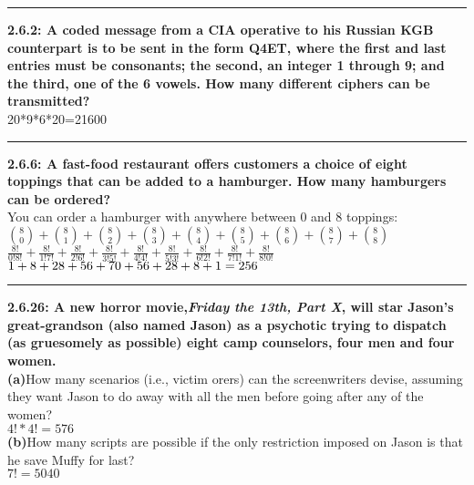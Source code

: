 \documentclass[11pt]{article}
\newcommand\question[2]{\vspace{.25in}\hrule\textbf{#1: #2}}
\renewcommand\part[1]{\vspace{.10in}\textbf{(#1)}}
\begin{document}
\raggedright
\newcommand\NAME{Jonathan Lopez}  %
\newcommand\HWNUM{2}              %


\question{2.6.2} {A coded message from a CIA operative to his Russian KGB counterpart
is to be sent in the form Q4ET, where the first and last entries must be consonants;
the second, an integer 1 through 9; and the third, one of the 6 vowels. How many
different ciphers can be transmitted?}\\
20*9*6*20=21600

\question{2.6.6}{A fast-food restaurant offers customers a choice of eight
toppings that can be added to a hamburger. How many hamburgers can be ordered?}\\
You can order a hamburger with anywhere between 0 and 8 toppings:
$
\binom{8}{0}+
\binom{8}{1}+
\binom{8}{2}+
\binom{8}{3}+
\binom{8}{4}+
\binom{8}{5}+
\binom{8}{6}+
\binom{8}{7}+
\binom{8}{8}
$ \\
$
\frac{8!}{0!8!} + 
\frac{8!}{1!7!} + 
\frac{8!}{2!6!} + 
\frac{8!}{3!5!} + 
\frac{8!}{4!4!} + 
\frac{8!}{5!3!} + 
\frac{8!}{6!2!} + 
\frac{8!}{7!1!} + 
\frac{8!}{8!0!}
$
$\\ 
1 + 8 + 28 + 56 + 70 + 56 + 28 + 8 + 1 = 256
$ \\

\question{2.6.26}{A new horror movie,\emph{Friday the 13th, Part X}, will star
    Jason's great-grandson (also named Jason) as a psychotic trying to dispatch
(as gruesomely as possible) eight camp counselors, four men and four women.}
\\ \part{a}{How many scenarios (i.e., victim orers) can the screenwriters devise,
assuming they want Jason to do away with all the men before going after any of the
women?} \\
$4!*4!=576$
\\ \part{b}{How many scripts are possible if the only restriction imposed on Jason
is that he save Muffy for last?} \\
$7!=5040$
\end{document}
